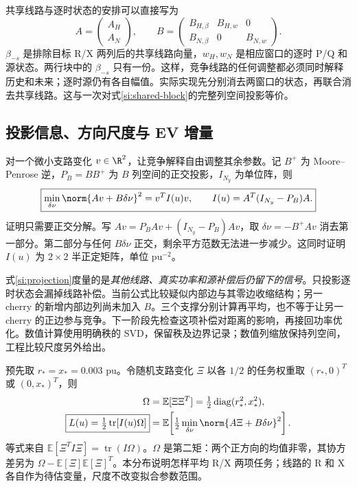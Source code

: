 共享线路与逐时状态的安排可以直接写为
\begin{equation}
 A=\begin{pmatrix}A_H\\A_N\end{pmatrix},\qquad
 B=\begin{pmatrix}
 B_{H,\beta}&B_{H,w}&0\\
 B_{N,\beta}&0&B_{N,w}
 \end{pmatrix}.
 \label{si:shared-block}
\end{equation}
$\beta_{-s}$ 是排除目标 R/X 两列后的共享线路向量，$w_H,w_N$ 是相应窗口的逐时 P/Q 和源状态。两行块中的 $\beta_{-s}$ 只有一份。这样，竞争线路的任何调整都必须同时解释历史和未来；逐时源仍有各自幅值。实际实现先分别消去两窗口的状态，再联合消去共享线路。这与一次对式\eqref{si:shared-block}的完整列空间投影等价。

\subsection{投影信息、方向尺度与 EV 增量}

对一个微小支路变化 $v\in\R^2$，让竞争解释自由调整其余参数。记 $B^+$ 为 Moore--Penrose 逆，$P_B=BB^+$ 为 $B$ 列空间的正交投影，$I_{N_y}$ 为单位阵，则
\begin{equation}
 \boxed{\min_{\delta\nu}\norm{Av+B\delta\nu}^2
 =v^T I(u)v,\qquad I(u)=A^T(I_{N_y}-P_B)A.}
 \label{si:projection}
\end{equation}
证明只需要正交分解。写 $Av=P_BAv+(I_{N_y}-P_B)Av$，取 $\delta\nu=-B^+Av$ 消去第一部分。第二部分与任何 $B\delta\nu$ 正交，剩余平方范数无法进一步减少。这同时证明 $I(u)$ 为 $2\times2$ 半正定矩阵，单位 pu$^{-2}$。

式\eqref{si:projection}度量的是\emph{其他线路、真实功率和源补偿后仍留下的信号}。只投影逐时状态会漏掉线路补偿。当前公式比较疑似内部边与其零边收缩结构；另一 cherry 的新增内部边列尚未加入 $B$。三个支撑分别计算再平均，也不等于让另一 cherry 的正边参与竞争。下一阶段先检查这项补偿对距离的影响，再接回功率优化。数值计算使用明确秩的 SVD，保留秩及边界记录；数值列缩放保持列空间，工程比较尺度另外给出。

预先取 $r_*=x_*=0.003$ pu。令随机支路变化 $\Xi$ 以各 $1/2$ 的任务权重取 $(r_*,0)^T$ 或 $(0,x_*)^T$，则
\begin{align}
 \Omega&=\mathbb E[\Xi\Xi^T]=\tfrac12\operatorname{diag}(r_*^2,x_*^2),\nonumber\\
 \boxed{L(u)=\tfrac12\operatorname{tr}[I(u)\Omega]}
 &=\mathbb E\!\left[\tfrac12\min_{\delta\nu}\norm{A\Xi+B\delta\nu}^2\right].
 \label{si:scale}
\end{align}
等式来自 $\mathbb E[\Xi^TI\Xi]=\operatorname{tr}(I\Omega)$。$\Omega$ 是第二矩：两个正方向的均值非零，其协方差另为 $\Omega-\mathbb E[\Xi]\mathbb E[\Xi]^T$。本分布说明怎样平均 R/X 两项任务；线路的 R 和 X 各自作为待估变量，尺度不改变拟合参数范围。

